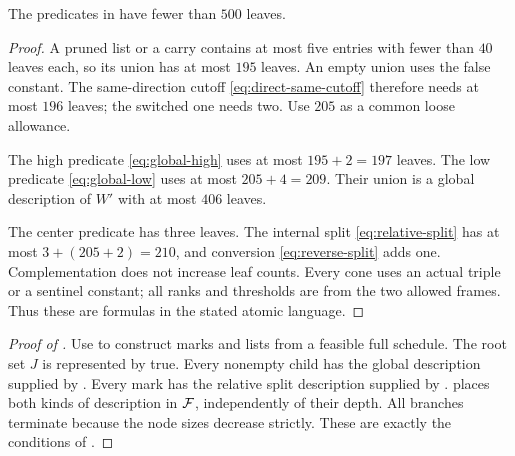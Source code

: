 \begin{lemma}\label{lem:final-count}
The predicates in 
have fewer than \(500\) leaves.
\end{lemma}
\begin{proof}
A pruned list or a carry contains at most five entries with fewer
than \(40\) leaves each, so its union has at most \(195\) leaves.
An empty union uses the false constant.
The same-direction cutoff \eqref{eq:direct-same-cutoff} therefore
needs at most \(196\) leaves; the switched one needs two.
Use \(205\) as a common loose allowance.

The high predicate \eqref{eq:global-high} uses at most
\(195+2=197\) leaves. The low predicate
\eqref{eq:global-low} uses at most \(205+4=209\).
Their union is a global description of \(W'\) with at most
\(406\) leaves.

The center predicate has three leaves. The internal split
\eqref{eq:relative-split} has at most \(3+(205+2)=210\),
and conversion \eqref{eq:reverse-split} adds one.
Complementation does not increase leaf counts.
Every cone uses an actual triple or a sentinel constant; all ranks
and thresholds are from the two allowed frames. Thus these are
formulas in the stated atomic language.
\end{proof}

\begin{proof}[Proof of ]
Use  to construct marks and lists
from a feasible full schedule.
The root set \(J\) is represented by true.
Every nonempty child has the global description supplied by
. Every mark has the relative split
description supplied by .
 places both kinds of description in
\(\mathcal F\), independently of their depth.
All branches terminate because the node sizes decrease strictly.
These are exactly the conditions of .
\end{proof}
